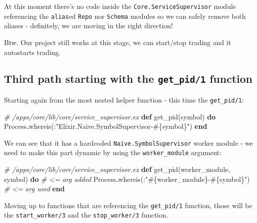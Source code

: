 \documentclass[
]{book}
\newenvironment{Shaded}{\begin{snugshade}}{\end{snugshade}}
\newcommand{\CommentTok}[1]{\textcolor[rgb]{0.56,0.35,0.01}{\textit{#1}}}
\newcommand{\ConstantTok}[1]{\textcolor[rgb]{0.00,0.00,0.00}{#1}}
\newcommand{\KeywordTok}[1]{\textcolor[rgb]{0.13,0.29,0.53}{\textbf{#1}}}
\newcommand{\NormalTok}[1]{#1}
\newcommand{\OperatorTok}[1]{\textcolor[rgb]{0.81,0.36,0.00}{\textbf{#1}}}
\newcommand{\OtherTok}[1]{\textcolor[rgb]{0.56,0.35,0.01}{#1}}
\newcommand{\StringTok}[1]{\textcolor[rgb]{0.31,0.60,0.02}{#1}}
\begin{document}
At this moment there's no code inside the \texttt{Core.ServiceSupervisor} module referencing the \texttt{alias}ed \texttt{Repo} nor \texttt{Schema} modules so we can safely remove both aliases - definitely, we are moving in the right direction!

Btw. Our project still works at this stage, we can start/stop trading and it autostarts trading.

\hypertarget{third-path-starting-with-the-get_pid1-function}{%
\subsection{\texorpdfstring{Third path starting with the \texttt{get\_pid/1} function}{Third path starting with the get\_pid/1 function}}\label{third-path-starting-with-the-get_pid1-function}}

Starting again from the most nested helper function - this time the \texttt{get\_pid/1}:

\begin{Shaded}
\begin{Highlighting}[]
  \CommentTok{\# /apps/core/lib/core/service\_supervisor.ex}
  \KeywordTok{def}\NormalTok{ get\_pid(symbol) }\KeywordTok{do}
    \ConstantTok{Process}\OperatorTok{.}\NormalTok{whereis(:}\StringTok{"Elixir.Naive.SymbolSupervisor{-}}\OtherTok{\#\{}\NormalTok{symbol}\OtherTok{\}}\StringTok{"}\NormalTok{)}
  \KeywordTok{end}  
\end{Highlighting}
\end{Shaded}

We can see that it has a hardcoded \texttt{Naive.SymbolSupervisor} worker module - we need to make this part dynamic by using the \texttt{worker\_module} argument:

\begin{Shaded}
\begin{Highlighting}[]
  \CommentTok{\# /apps/core/lib/core/service\_supervisor.ex}
  \KeywordTok{def}\NormalTok{ get\_pid(worker\_module, symbol) }\KeywordTok{do}  \CommentTok{\# \textless{}= arg added}
    \ConstantTok{Process}\OperatorTok{.}\NormalTok{whereis(:}\StringTok{"}\OtherTok{\#\{}\NormalTok{worker\_module}\OtherTok{\}}\StringTok{{-}}\OtherTok{\#\{}\NormalTok{symbol}\OtherTok{\}}\StringTok{"}\NormalTok{) }\CommentTok{\# \textless{}= arg used}
  \KeywordTok{end}
\end{Highlighting}
\end{Shaded}

Moving up to functions that are referencing the \texttt{get\_pid/1} function, those will be the \texttt{start\_worker/3} and the \texttt{stop\_worker/3} function.
\end{document}
